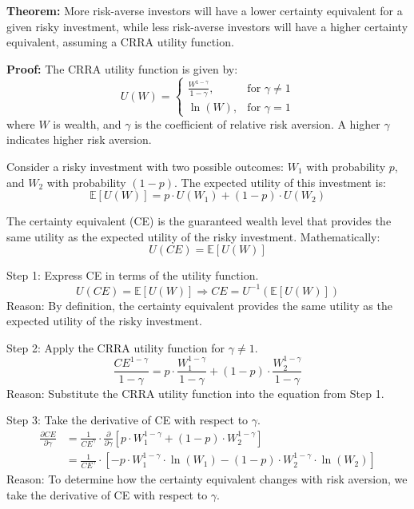 \documentclass{article}
\begin{document}
\textbf{Theorem:} More risk-averse investors will have a lower certainty equivalent for a given risky investment, while less risk-averse investors will have a higher certainty equivalent, assuming a CRRA utility function.

\textbf{Proof:}
The CRRA utility function is given by:
\begin{equation}
U(W) = 
\begin{cases}
\frac{W^{1-\gamma}}{1-\gamma}, & \text{for } \gamma \neq 1 \\
\ln(W), & \text{for } \gamma = 1
\end{cases}
\end{equation}
where $W$ is wealth, and $\gamma$ is the coefficient of relative risk aversion. A higher $\gamma$ indicates higher risk aversion.

Consider a risky investment with two possible outcomes: $W_1$ with probability $p$, and $W_2$ with probability $(1-p)$. The expected utility of this investment is:
\begin{equation}
\mathbb{E}[U(W)] = p \cdot U(W_1) + (1-p) \cdot U(W_2)
\end{equation}

The certainty equivalent (CE) is the guaranteed wealth level that provides the same utility as the expected utility of the risky investment. Mathematically:
\begin{equation}
U(CE) = \mathbb{E}[U(W)]
\end{equation}

Step 1: Express CE in terms of the utility function.
\begin{equation}
U(CE) = \mathbb{E}[U(W)] \Rightarrow CE = U^{-1}(\mathbb{E}[U(W)])
\end{equation}
Reason: By definition, the certainty equivalent provides the same utility as the expected utility of the risky investment.

Step 2: Apply the CRRA utility function for $\gamma \neq 1$.
\begin{equation}
\frac{CE^{1-\gamma}}{1-\gamma} = p \cdot \frac{W_1^{1-\gamma}}{1-\gamma} + (1-p) \cdot \frac{W_2^{1-\gamma}}{1-\gamma}
\end{equation}
Reason: Substitute the CRRA utility function into the equation from Step 1.

Step 3: Take the derivative of CE with respect to $\gamma$.
\begin{align}
\frac{\partial CE}{\partial \gamma} &= \frac{1}{CE^\gamma} \cdot \frac{\partial}{\partial \gamma}\left[p \cdot W_1^{1-\gamma} + (1-p) \cdot W_2^{1-\gamma}\right] \\
&= \frac{1}{CE^\gamma} \cdot \left[-p \cdot W_1^{1-\gamma} \cdot \ln(W_1) - (1-p) \cdot W_2^{1-\gamma} \cdot \ln(W_2)\right]
\end{align}
Reason: To determine how the certainty equivalent changes with risk aversion, we take the derivative of CE with respect to $\gamma$.
\end{document}
